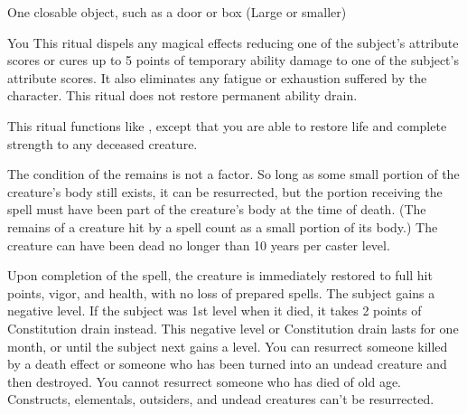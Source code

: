 \begin{spelltarget}{One closable object, such as a door or box (Large or smaller)}
\begin{spelltarget}{You}
\spelleffect This ritual dispels any magical effects reducing one of the subject's attribute scores or cures up to 5 points of temporary ability damage to one of the subject's attribute scores. It also eliminates any fatigue or exhaustion suffered by the character.
\spellnotes This ritual does not restore permanent ability drain.

\spelleffect This ritual functions like , except that you are able to restore life and complete strength to any deceased creature.
\par The condition of the remains is not a factor. So long as some small portion of the creature's body still exists, it can be resurrected, but the portion receiving the spell must have been part of the creature's body at the time of death. (The remains of a creature hit by a  spell count as a small portion of its body.) The creature can have been dead no longer than 10 years per caster level.
\par Upon completion of the spell, the creature is immediately restored to full hit points, vigor, and health, with no loss of prepared spells. The subject gains a negative level. If the subject was 1st level when it died, it takes 2 points of Constitution drain instead. This negative level or Constitution drain lasts for one month, or until the subject next gains a level.
\spellnotes You can resurrect someone killed by a death effect or someone who has been turned into an undead creature and then destroyed. You cannot resurrect someone who has died of old age. Constructs, elementals, outsiders, and undead creatures can't be resurrected.


\end{spelltarget}
\end{spelltarget}
